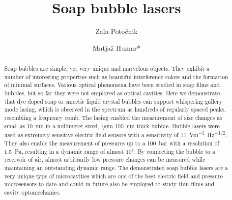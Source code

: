 \documentclass[a4paper,12pt]{article}
\begin{document}
	
	\title{Soap bubble lasers}
	\date{}
	\author[1,2]{Zala Poto\v cnik}
	\author[1,2,3]{Matja\v z Humar*}
	\maketitle
	

	\begin{abstract}
		
		Soap bubbles are simple, yet very unique and marvelous objects. They exhibit a number of interesting properties such as beautiful interference colors and the formation of minimal surfaces. Various optical phenomena have been studied in soap films and bubbles, but so far they were not employed as optical cavities. Here we demonstrate, that dye doped soap or smectic liquid crystal bubbles can support whispering gallery mode lasing, which is observed in the spectrum as hundreds of regularly spaced peaks, resembling a frequency comb. The lasing enabled the measurement of size changes as small as \SI{10}{nm} in a millimeter-sized, \SI{\sim 100}{nm} thick bubble. Bubble lasers were used as extremely sensitive electric field sensors with a sensitivity of \SI{11}{Vm^{-1}Hz^{-1/2}}. They also enable the measurement of pressures up to a \SI{100}{bar} with a resolution of \SI{1.5}{Pa}, resulting in a dynamic range of almost $10^7$. By connecting the bubble to a reservoir of air, almost arbitrarily low pressure changes can be measured while maintaining an outstanding dynamic range. The demonstrated soap bubble lasers are a very unique type of microcavities which are one of the best electric field and pressure microsensors to date and could in future also be employed to study thin films and cavity optomechanics.
		
	\end{abstract}
	
\end{document}
